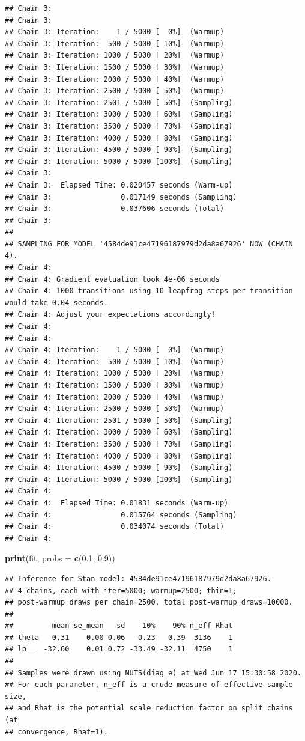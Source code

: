 \documentclass[
  12pt,
]{book}
\newenvironment{Shaded}{\begin{snugshade}}{\end{snugshade}}
\newcommand{\DataTypeTok}[1]{\textcolor[rgb]{0.13,0.29,0.53}{#1}}
\newcommand{\FloatTok}[1]{\textcolor[rgb]{0.00,0.00,0.81}{#1}}
\newcommand{\KeywordTok}[1]{\textcolor[rgb]{0.13,0.29,0.53}{\textbf{#1}}}
\newcommand{\NormalTok}[1]{#1}
\theoremstyle{definition}
\theoremstyle{definition}
\theoremstyle{definition}
\theoremstyle{remark}
\begin{document}
\begin{verbatim}
## Chain 3: 
## Chain 3: 
## Chain 3: Iteration:    1 / 5000 [  0%]  (Warmup)
## Chain 3: Iteration:  500 / 5000 [ 10%]  (Warmup)
## Chain 3: Iteration: 1000 / 5000 [ 20%]  (Warmup)
## Chain 3: Iteration: 1500 / 5000 [ 30%]  (Warmup)
## Chain 3: Iteration: 2000 / 5000 [ 40%]  (Warmup)
## Chain 3: Iteration: 2500 / 5000 [ 50%]  (Warmup)
## Chain 3: Iteration: 2501 / 5000 [ 50%]  (Sampling)
## Chain 3: Iteration: 3000 / 5000 [ 60%]  (Sampling)
## Chain 3: Iteration: 3500 / 5000 [ 70%]  (Sampling)
## Chain 3: Iteration: 4000 / 5000 [ 80%]  (Sampling)
## Chain 3: Iteration: 4500 / 5000 [ 90%]  (Sampling)
## Chain 3: Iteration: 5000 / 5000 [100%]  (Sampling)
## Chain 3: 
## Chain 3:  Elapsed Time: 0.020457 seconds (Warm-up)
## Chain 3:                0.017149 seconds (Sampling)
## Chain 3:                0.037606 seconds (Total)
## Chain 3: 
## 
## SAMPLING FOR MODEL '4584de91ce47196187979d2da8a67926' NOW (CHAIN 4).
## Chain 4: 
## Chain 4: Gradient evaluation took 4e-06 seconds
## Chain 4: 1000 transitions using 10 leapfrog steps per transition would take 0.04 seconds.
## Chain 4: Adjust your expectations accordingly!
## Chain 4: 
## Chain 4: 
## Chain 4: Iteration:    1 / 5000 [  0%]  (Warmup)
## Chain 4: Iteration:  500 / 5000 [ 10%]  (Warmup)
## Chain 4: Iteration: 1000 / 5000 [ 20%]  (Warmup)
## Chain 4: Iteration: 1500 / 5000 [ 30%]  (Warmup)
## Chain 4: Iteration: 2000 / 5000 [ 40%]  (Warmup)
## Chain 4: Iteration: 2500 / 5000 [ 50%]  (Warmup)
## Chain 4: Iteration: 2501 / 5000 [ 50%]  (Sampling)
## Chain 4: Iteration: 3000 / 5000 [ 60%]  (Sampling)
## Chain 4: Iteration: 3500 / 5000 [ 70%]  (Sampling)
## Chain 4: Iteration: 4000 / 5000 [ 80%]  (Sampling)
## Chain 4: Iteration: 4500 / 5000 [ 90%]  (Sampling)
## Chain 4: Iteration: 5000 / 5000 [100%]  (Sampling)
## Chain 4: 
## Chain 4:  Elapsed Time: 0.01831 seconds (Warm-up)
## Chain 4:                0.015764 seconds (Sampling)
## Chain 4:                0.034074 seconds (Total)
## Chain 4:
\end{verbatim}

\begin{Shaded}
\begin{Highlighting}[]
\KeywordTok{print}\NormalTok{(fit, }\DataTypeTok{probs =} \KeywordTok{c}\NormalTok{(}\FloatTok{0.1}\NormalTok{, }\FloatTok{0.9}\NormalTok{))}
\end{Highlighting}
\end{Shaded}

\begin{verbatim}
## Inference for Stan model: 4584de91ce47196187979d2da8a67926.
## 4 chains, each with iter=5000; warmup=2500; thin=1; 
## post-warmup draws per chain=2500, total post-warmup draws=10000.
## 
##         mean se_mean   sd    10%    90% n_eff Rhat
## theta   0.31    0.00 0.06   0.23   0.39  3136    1
## lp__  -32.60    0.01 0.72 -33.49 -32.11  4750    1
## 
## Samples were drawn using NUTS(diag_e) at Wed Jun 17 15:30:58 2020.
## For each parameter, n_eff is a crude measure of effective sample size,
## and Rhat is the potential scale reduction factor on split chains (at 
## convergence, Rhat=1).
\end{verbatim}
\end{document}
